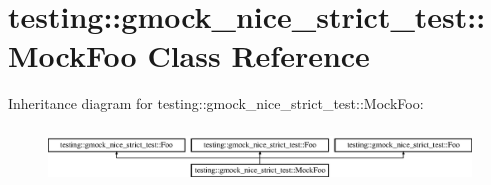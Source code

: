 \hypertarget{classtesting_1_1gmock__nice__strict__test_1_1_mock_foo}{}\section{testing\+::gmock\+\_\+nice\+\_\+strict\+\_\+test\+::Mock\+Foo Class Reference}
\label{classtesting_1_1gmock__nice__strict__test_1_1_mock_foo}
Inheritance diagram for testing\+::gmock\+\_\+nice\+\_\+strict\+\_\+test\+::Mock\+Foo\+:\begin{figure}[H]
\begin{center}
\leavevmode
\includegraphics[height=1.505376cm]{d5/dd3/classtesting_1_1gmock__nice__strict__test_1_1_mock_foo}
\end{center}
\end{figure}
